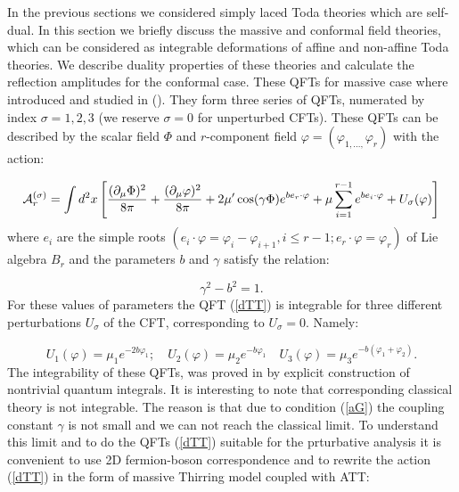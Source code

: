 \documentclass[a4paper,12pt]{article}
\begin{document}
In the previous sections we considered simply laced Toda theories which are
self-dual. In this section we briefly discuss the massive and conformal
field theories, which can be considered as integrable deformations of affine
and non-affine Toda theories. We describe duality properties of these
theories and calculate the reflection amplitudes for the conformal case.
These QFTs for massive case where introduced and studied in (\cite{FA}).
They form three series of QFTs, numerated by index $\sigma =1,2,3$ (we
reserve $\sigma =0$ for unperturbed CFTs). These QFTs can be described by the
scalar field $\Phi $ and $r$-component field $\varphi =\left( \varphi
_{1,...,}\varphi _r\right) $ with the action:

\begin{equation}
{\cal A}_r^{(\sigma )}=\int d^2x \left [ \frac{(\partial _\mu \Phi )^2}{8\pi }+
\frac{(\partial _\mu \varphi )^2}{8\pi }+2\mu ^{\prime }\cos (\gamma \Phi
)e^{be_r\cdot \varphi } 
 +\mu \sum\limits_{i=1}^{r-1}e^{be_i\cdot \varphi}
+U_\sigma (\varphi ) \right]  \label{dTT}
\end{equation}
where $e_i$ are the simple roots $(e_i\cdot \varphi =\varphi _i-\varphi
_{i+1},i\leq r-1;e_r\cdot \varphi =\varphi _r)$ of Lie algebra $B_r$ and the
parameters $b$ and $\gamma $ satisfy the relation:

\begin{equation}
\gamma ^2-b^2=1.  \label{aG}
\end{equation}
For these values of parameters the QFT (\ref{dTT}) is integrable for three
different perturbations $U_\sigma $ of the CFT, corresponding to $U_\sigma
=0.$ Namely:

\begin{equation}
U_1(\varphi )=\mu _1e^{-2b\varphi _1};\quad U_2(\varphi )=\mu _2e^{-b\varphi
_1}\quad U_3(\varphi )=\mu _3e^{-b(\varphi _1+\varphi _2)}.  \label{Us}
\end{equation}
The integrability of these QFTs, was proved in \cite{FA} by explicit
construction of nontrivial quantum integrals. It is interesting to note that
corresponding classical theory is not integrable. The reason is that due to
condition (\ref{aG}) the coupling constant $\gamma $ is not small and we can
not reach the classical limit. To understand this limit and to do the QFTs  
(\ref{dTT}) suitable for the prturbative analysis it is convenient to use 2D
fermion-boson correspondence \cite{CM} and to rewrite the action (\ref{dTT})
in the form of massive Thirring model coupled with ATT:
\end{document}
